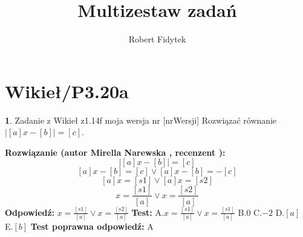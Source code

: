 \documentclass[12pt, a4paper]{article}
\title{Multizestaw zadań}
\author{Robert Fidytek}
\date{}
\theoremstyle{definition} %
\newtheorem{zad}{}
\newcommand{\kategoria}[1]{\section{#1}} %
\newcommand{\zadStart}[1]{\begin{zad}#1\newline} %
\newcommand{\zadStop}{\end{zad}}   %
\newcommand{\rozwStart}[2]{\noindent \textbf{Rozwiązanie (autor #1 , recenzent #2): }\newline} %
\newcommand{\rozwStop}{\newline}                                            %
\newcommand{\odpStart}{\noindent \textbf{Odpowiedź:}\newline}    %
\newcommand{\odpStop}{\newline}                                             %
\newcommand{\testStart}{\noindent \textbf{Test:}\newline} %
\newcommand{\testStop}{\newline} %
\newcommand{\kluczStart}{\noindent \textbf{Test poprawna odpowiedź:}\newline} %
\newcommand{\kluczStop}{\newline} %
\begin{document}
\maketitle


\kategoria{Wikieł/P3.20a}
\zadStart{Zadanie z Wikieł z1.14f moja wersja nr [nrWersji]}
Rozwiązać równanie  $|[a]x-[b]|=[c]$.
\zadStop
\rozwStart{Mirella Narewska}{}
$$|[a]x-[b]|=[c]  $$
$$[a]x-[b]=[c]  \vee [a]x-[b]=-[c]$$
$$ [a]x=[s1] \vee  [a]x=[s2] $$ 
$$ x=\frac{[s1]}{[a]} \vee x=\frac{[s2]}{[a]}$$ 
\rozwStop
\odpStart
$x=\frac{[s1]}{[a]} \vee x=\frac{[s2]}{[a]}$
\odpStop
\testStart
A.$x=\frac{[s1]}{[a]} \vee x=\frac{[s1]}{[a]}$
B.$0$
C.$-2$
D.$[a]$
E.$[b]$
\testStop
\kluczStart
A
\kluczStop
\end{document}
